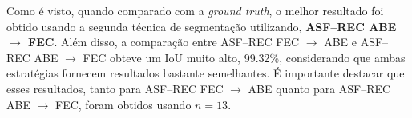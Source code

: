 Como é visto, quando comparado com a \textit{ground truth}, o melhor resultado foi obtido usando a segunda técnica de segmentação utilizando, \textbf{ASF–REC ABE $\rightarrow$ FEC}. Além disso, a comparação entre ASF–REC FEC $\rightarrow$ ABE e ASF–REC ABE $\rightarrow$ FEC obteve um IoU muito alto, 99.32\%, considerando que ambas estratégias fornecem resultados bastante semelhantes. É importante destacar que esses resultados, tanto para ASF–REC FEC $\rightarrow$ ABE quanto para ASF–REC ABE $\rightarrow$ FEC, foram obtidos usando $n=13$. 

